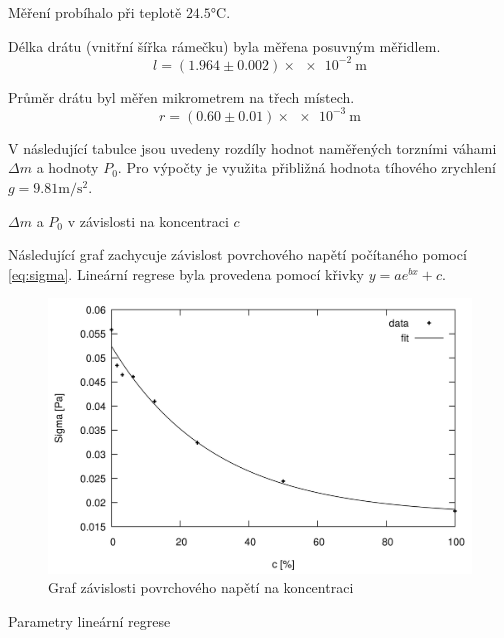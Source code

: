 \documentclass[protokol.tex]{subfiles}
\begin{document}

Měření probíhalo při teplotě $24.5 \si{\celsius}$.

Délka drátu (vnitřní šířka rámečku) byla měřena posuvným měřidlem.
$$ l = (1.964 \pm 0.002) \times \num{e-2} \ \si{\metre} $$

Průměr drátu byl měřen mikrometrem na třech místech.
$$ r = (0.60 \pm 0.01) \times \num{e-3} \ \si{\metre} $$

V následující tabulce jsou uvedeny rozdíly hodnot naměřených torzními váhami $\Delta m$ a hodnoty $P_0$. Pro výpočty je využita přibližná hodnota tíhového zrychlení $g = 9.81 \si{\metre\per\second\squared}$.

\begin{table}[H] \label{tab:tab}
\centering
\setlength{\tabcolsep}{15pt}

\caption{$\Delta m$ a $P_0$ v závislosti na koncentraci $c$}
\end{table}

\newpage

Následující graf zachycuje závislost povrchového napětí počítaného pomocí \eqref{eq:sigma}. Lineární regrese byla provedena pomocí křivky $y = ae^{bx} + c$.
\begin{figure}[H]
\centering
\includegraphics[resolution=350]{plot/out}
\caption{Graf závislosti povrchového napětí na koncentraci}
\end{figure}

\begin{table}[H] \label{tab:parametry}
\centering
\setlength{\tabcolsep}{10pt}

\caption{Parametry lineární regrese}
\end{table}
\end{document}
